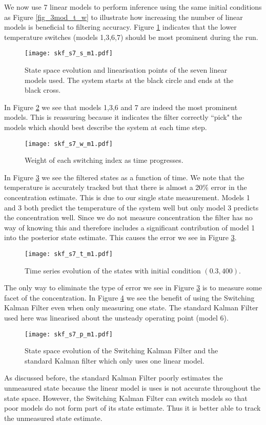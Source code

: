 We now use 7 linear models to perform inference using the same initial conditions as Figure \ref{fig_3mod_t_w} to illustrate how increasing the number of linear models is beneficial to filtering accuracy. Figure \ref{fig_7mod_ss_m1} indicates that the lower temperature switches (models 1,3,6,7) should be most prominent during the run.  
\begin{figure}[H] 
\centering
\texttt{[image: skf\_s7\_s\_m1.pdf]}
\caption{State space evolution and linearisation points of the seven linear models used. The system starts at the black circle and ends at the black cross.}
\label{fig_7mod_ss_m1}
\end{figure}
In Figure \ref{fig_7mod_w_m1} we see that models 1,3,6 and 7 are indeed the most prominent models. This is reassuring because it indicates the filter correctly ``pick" the models which should best describe the system at each time step. 
\begin{figure}[H] 
\centering
\texttt{[image: skf\_s7\_w\_m1.pdf]}
\caption{Weight of each switching index as time progresses.}
\label{fig_7mod_w_m1}
\end{figure}
In Figure \ref{fig_7mod_t_m1} we see the filtered states as a function of time. We note that the temperature is accurately tracked but that there is almost a 20\% error in the concentration estimate. This is due to our single state measurement. Models 1 and 3 both predict the temperature of the system well but only model 3 predicts the concentration well. Since we do not measure concentration the filter has no way of knowing this and therefore includes a significant contribution of model 1 into the posterior state estimate. This causes the error we see in Figure \ref{fig_7mod_t_m1}.  
\begin{figure}[H] 
\centering
\texttt{[image: skf\_s7\_t\_m1.pdf]}
\caption{Time series evolution of the states with initial condition $(0.3, 400)$.}
\label{fig_7mod_t_m1}
\end{figure}
The only way to eliminate the type  of error we see in Figure \ref{fig_7mod_t_m1} is to measure some facet of the concentration. In Figure \ref{fig_7mod_p_m1} we see the benefit of using the Switching Kalman Filter even when only measuring one state. The standard Kalman Filter used here was linearised about the unsteady operating point (model 6).
\begin{figure}[H] 
\centering
\texttt{[image: skf\_s7\_p\_m1.pdf]}
\caption{State space evolution of the Switching Kalman Filter and the standard Kalman filter which only uses one linear model.}
\label{fig_7mod_p_m1}
\end{figure}
As discussed before, the standard Kalman Filter poorly estimates the unmeasured state because the linear model is uses is not accurate throughout the state space. However, the Switching Kalman Filter can switch models so that poor models do not form part of its state estimate. Thus it is better able to track the unmeasured state estimate.  

